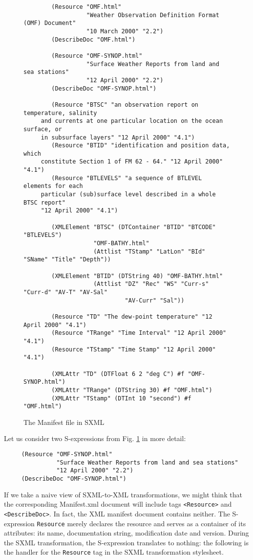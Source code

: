 \documentclass[10pt]{llncs}
\begin{document}
\begin{figure}
\begin{verbatim}
        (Resource "OMF.html"
                  "Weather Observation Definition Format (OMF) Document" 
                  "10 March 2000" "2.2")
        (DescribeDoc "OMF.html")
     
        (Resource "OMF-SYNOP.html"
                  "Surface Weather Reports from land and sea stations" 
                  "12 April 2000" "2.2")
        (DescribeDoc "OMF-SYNOP.html")
     
        (Resource "BTSC" "an observation report on temperature, salinity
     and currents at one particular location on the ocean surface, or
     in subsurface layers" "12 April 2000" "4.1")
        (Resource "BTID" "identification and position data, which
     constitute Section 1 of FM 62 - 64." "12 April 2000" "4.1")
        (Resource "BTLEVELS" "a sequence of BTLEVEL elements for each
     particular (sub)surface level described in a whole BTSC report"
     "12 April 2000" "4.1")
     
        (XMLElement "BTSC" (DTContainer "BTID" "BTCODE" "BTLEVELS")
                    "OMF-BATHY.html"
                    (Attlist "TStamp" "LatLon" "BId" "SName" "Title" "Depth"))
     
        (XMLElement "BTID" (DTString 40) "OMF-BATHY.html"
                    (Attlist "DZ" "Rec" "WS" "Curr-s" "Curr-d" "AV-T" "AV-Sal"
                             "AV-Curr" "Sal"))
     
        (Resource "TD" "The dew-point temperature" "12 April 2000" "4.1")
        (Resource "TRange" "Time Interval" "12 April 2000" "4.1")
        (Resource "TStamp" "Time Stamp" "12 April 2000" "4.1")
     
        (XMLAttr "TD" (DTFloat 6 2 "deg C") #f "OMF-SYNOP.html")
        (XMLAttr "TRange" (DTString 30) #f "OMF.html")
        (XMLAttr "TStamp" (DTInt 10 "second") #f "OMF.html")
\end{verbatim}
\caption{\label{Manifest-SCM-snippets}The Manifest file in SXML}\end{figure}
Let us consider two S-expressions from Fig. \ref{Manifest-SCM-snippets} in more detail:

\begin{verbatim}
     (Resource "OMF-SYNOP.html"
               "Surface Weather Reports from land and sea stations" 
               "12 April 2000" "2.2")
     (DescribeDoc "OMF-SYNOP.html")
\end{verbatim}
If we take a naive view of SXML-to-XML transformations, we
might think that the corresponding Manifest.xml document \cite{Manifest-XML} will include tags \texttt{<Resource>} and
\texttt{<DescribeDoc>}. In fact, the XML manifest document
contains neither. The S-expression \texttt{Resource} merely
declares the resource and serves as a container of its attributes: its
name, documentation string, modification date and 
version. During the SXML transformation, the S-expression translates
to nothing: the following is the handler for the \texttt{Resource}
tag in the SXML transformation stylesheet.
\end{document}
